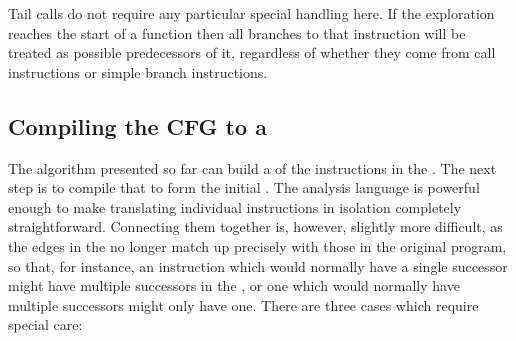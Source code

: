 
Tail calls do not require any particular special handling here.  If
the exploration reaches the start of a function then all branches to
that instruction will be treated as possible predecessors of it,
regardless of whether they come from call instructions or simple
branch instructions.

\subsection{Compiling the CFG to a \StateMachine}
\label{sect:derive:compile_cfg}


The algorithm presented so far can build a  of the
instructions in the .  The next step is to
compile that  to form the initial {\StateMachine}.  The
{\StateMachine} analysis language is powerful enough to make
translating individual instructions in isolation completely
straightforward.  Connecting them together is, however, slightly more
difficult, as the edges in the  no longer match up
precisely with those in the original program, so that, for instance,
an instruction which would normally have a single successor might have
multiple successors in the , or one which would normally
have multiple successors might only have one.  There are three cases
which require special care:

